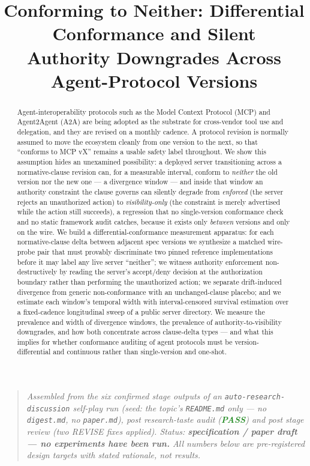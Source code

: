 \documentclass[11pt]{article}
\title{\textbf{Conforming to Neither: Differential Conformance and Silent\\ Authority Downgrades Across Agent-Protocol Versions}}
\author{}
\date{}
\begin{document}
\maketitle
\vspace{-2em}

\begin{quote}
\small\textit{Assembled from the six confirmed stage outputs of an \texttt{auto-research-discussion} self-play run (seed: the topic's \texttt{README.md} only --- no \texttt{digest.md}, no \texttt{paper.md}), post research-taste audit (\textcolor{ForestGreen}{\textbf{PASS}}) and post stage review (two REVISE fixes applied). Status: \textbf{specification / paper draft --- no experiments have been run.} All numbers below are pre-registered design targets with stated rationale, not results.}
\end{quote}

\begin{abstract}
Agent-interoperability protocols such as the Model Context Protocol (MCP) and Agent2Agent (A2A) are being adopted as the substrate for cross-vendor tool use and delegation, and they are revised on a monthly cadence. A protocol revision is normally assumed to move the ecosystem cleanly from one version to the next, so that ``conforms to MCP vX'' remains a usable safety label throughout. We show this assumption hides an unexamined possibility: a deployed server transitioning across a normative-clause revision can, for a measurable interval, conform to \emph{neither} the old version nor the new one --- a divergence window --- and inside that window an authority constraint the clause governs can silently degrade from \emph{enforced} (the server rejects an unauthorized action) to \emph{visibility-only} (the constraint is merely advertised while the action still succeeds), a regression that no single-version conformance check and no static framework audit catches, because it exists only \emph{between} versions and only on the wire. We build a differential-conformance measurement apparatus: for each normative-clause delta between adjacent spec versions we synthesize a matched wire-probe pair that must provably discriminate two pinned reference implementations before it may label any live server ``neither''; we witness authority enforcement non-destructively by reading the server's accept/deny decision at the authorization boundary rather than performing the unauthorized action; we separate drift-induced divergence from generic non-conformance with an unchanged-clause placebo; and we estimate each window's temporal width with interval-censored survival estimation over a fixed-cadence longitudinal sweep of a public server directory. We measure the prevalence and width of divergence windows, the prevalence of authority-to-visibility downgrades, and how both concentrate across clause-delta types --- and what this implies for whether conformance auditing of agent protocols must be version-differential and continuous rather than single-version and one-shot.
\end{abstract}
\end{document}
